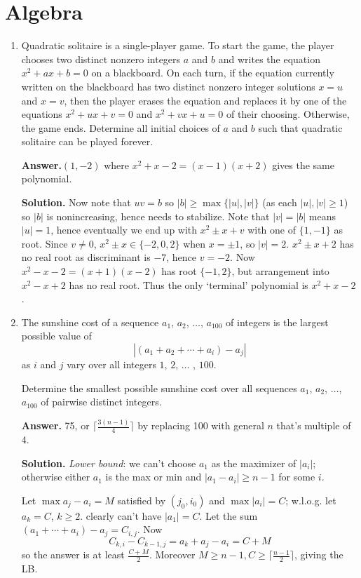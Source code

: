 \documentclass[11pt,a4paper]{article}
\begin{document}
	\section*{Algebra}
	\begin{enumerate}
		\item [A1.] 
		Quadratic solitaire is a single-player game. To start the game, the player chooses two distinct nonzero integers $a$ and $b$ and writes the equation $x^2+ax+b=0$ on a blackboard. On each turn, if the equation currently written on the blackboard has two distinct nonzero integer solutions $x=u$ and $x=v$, then the player erases the equation and replaces it by one of the equations $x^2+ux+v=0$ and $x^2+vx+u=0$ of their choosing. Otherwise, the game ends. Determine all initial choices of $a$ and $b$ such that quadratic solitaire can be played forever.
		
		\textbf{Answer.}$(1, -2)$ where $x^2+x-2=(x-1)(x+2)$ gives the same polynomial. 
		
		\textbf{Solution.}
		Now note that $uv = b$ so $|b|\ge \max\{|u|, |v|\}$ (as each $|u|, |v|\ge 1$)
		so $|b|$ is nonincreasing, hence needs to stabilize. 
		Note that $|v|=|b|$ means $|u|=1$, hence eventually we end up with $x^2\pm x + v$ with one of $\{1, -1\}$ as root. 
		Since $v\neq 0$, $x^2\pm x\in\{-2, 0, 2\}$ when $x=\pm 1$, 
		so $|v|=2$. $x^2\pm x+2$ has no real root as discriminant is $-7$, hence $v=-2$. 
		Now $x^2-x-2=(x+1)(x-2)$ has root $\{-1, 2\}$, 
		but arrangement into $x^2-x+2$ has no real root. 
		Thus the only `terminal' polynomial is $x^2+x-2$. 
		
		\item [A2.]
		The sunshine cost of a sequence $a_1$, $a_2$, $\ldots$, $a_{100}$ of integers is the largest possible value of
		\[|(a_1+a_2+\cdots+a_i)-a_j|\]as $i$ and $j$ vary over all integers $1$, $2$, $\ldots$ , $100$.
		
		
		Determine the smallest possible sunshine cost over all sequences $a_1$, $a_2$, $\ldots$, $a_{100}$ of pairwise distinct integers.
		
		\textbf{Answer.} 75, or $\lceil \frac{3(n-1)}{4}\rceil$ by replacing 100 with general $n$ that's multiple of 4. 
		
		\textbf{Solution.}
		\textit{Lower bound}: we can't choose $a_1$ as the maximizer of $|a_i|$; otherwise either $a_1$ is the max or min and $|a_1-a_i|\ge n - 1$ for some $i$. 
		
		Let $\max a_j-a_i=M$ satisfied by $(j_0, i_0)$ and $\max |a_i|=C$; w.l.o.g. let $a_k = C$, $k\ge 2$. 
		clearly can't have $|a_1|=C$. 
		Let the sum $(a_1+\cdots + a_i)-a_j=C_{i, j}$. 
		Now 
		\[
		C_{k, i} - C_{k - 1, j} = a_k + a_j - a_i = C + M
		\]
		so the answer is at least $\frac{C+M}{2}$. 
		Moreover $M\ge n - 1, C\ge \lceil \frac{n - 1}{2}\rceil$, giving the LB. 
		

\end{enumerate}
\end{document}
